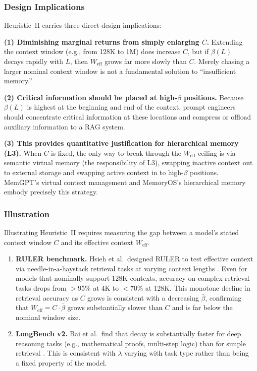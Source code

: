 \subsubsection{Design Implications}

Heuristic~II carries three direct design implications:

\textbf{(1) Diminishing marginal returns from simply enlarging $C$.} Extending the context window (e.g., from 128K to 1M) does increase $C$, but if $\beta(L)$ decays rapidly with $L$, then $W_{\mathrm{eff}}$ grows far more slowly than $C$. Merely chasing a larger nominal context window is not a fundamental solution to ``insufficient memory.''

\textbf{(2) Critical information should be placed at high-$\beta$ positions.} Because $\beta(L)$ is highest at the beginning and end of the context, prompt engineers should concentrate critical information at these locations and compress or offload auxiliary information to a RAG system.

\textbf{(3) This provides quantitative justification for hierarchical memory (L3).} When $C$ is fixed, the only way to break through the $W_{\mathrm{eff}}$ ceiling is via semantic virtual memory (the responsibility of L3), swapping inactive context out to external storage and swapping active context in to high-$\beta$ positions. MemGPT's virtual context management \cite{memgpt2023} and MemoryOS's hierarchical memory \cite{memoryos2025} embody precisely this strategy.

\subsubsection{Illustration}

Illustrating Heuristic~II requires measuring the gap between a model's stated context window $C$ and its effective context $W_{\mathrm{eff}}$.

\begin{enumerate}[nosep]
\item \textbf{RULER benchmark.} Hsieh et al.\ designed RULER to test effective context via needle-in-a-haystack retrieval tasks at varying context lengths \cite{ruler2024}. Even for models that nominally support 128K contexts, accuracy on complex retrieval tasks drops from $>$95\% at 4K to $<$70\% at 128K. This monotone decline in retrieval accuracy as $C$ grows is consistent with a decreasing $\bar{\beta}$, confirming that $W_{\mathrm{eff}} = C \cdot \bar{\beta}$ grows substantially slower than $C$ and is far below the nominal window size.

\item \textbf{LongBench v2.} Bai et al.\ find that decay is substantially faster for deep reasoning tasks (e.g., mathematical proofs, multi-step logic) than for simple retrieval \cite{longbenchv2_2024}. This is consistent with $\lambda$ varying with task type rather than being a fixed property of the model.
\end{enumerate}


